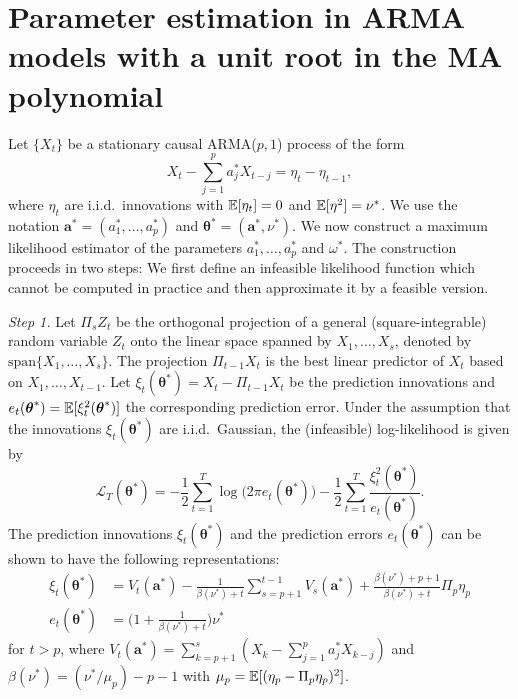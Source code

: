 \documentclass[a4paper,12pt]{article}
\begin{document}
\renewcommand{\baselinestretch}{1.2}\normalsize



\section{Parameter estimation in ARMA models with a unit root in the MA polynomial}


Let $\{X_t\}$ be a stationary causal ARMA($p,1$) process of the form 
\begin{equation}
X_t - \sum\limits_{j=1}^p a_j^* X_{t-j} = \eta_t - \eta_{t-1},
\end{equation}
where $\eta_t$ are i.i.d.\ innovations with $\mathbb{E}[\eta_t] = 0$ and $\mathbb{E}[\eta^2] = \nu^*$. We use the notation $\boldsymbol{a}^* = (a_1^*,\ldots,a_p^*)$ and $\boldsymbol{\theta}^* = (\boldsymbol{a}^*,\nu^*)$. We now construct a maximum likelihood estimator of the parameters $a_1^*,\ldots,a_p^*$ and $\omega^*$. The construction proceeds in two steps: We first define an infeasible likelihood function which cannot be computed in practice and then approximate it by a feasible version. 
\vspace{10pt}


\textit{Step 1.} Let $\Pi_s Z_t$ be the orthogonal projection of a general (square-integrable) random variable $Z_t$ onto the linear space spanned by $X_1,\ldots,X_s$, denoted by $\text{span}\{X_1,\ldots,X_s\}$. The projection $\Pi_{t-1} X_t$ is the best linear predictor of $X_t$ based on $X_1,\ldots,X_{t-1}$. Let $\xi_t(\boldsymbol{\theta}^*) = X_t - \Pi_{t-1} X_t$ be the prediction innovations and $e_t(\boldsymbol{\theta}^*) = \mathbb{E}[ \xi_t^2(\boldsymbol{\theta}^*)]$ the corresponding prediction error. Under the assumption that the innovations $\xi_t(\boldsymbol{\theta}^*)$ are i.i.d.\ Gaussian, the (infeasible) log-likelihood is given by  
\[ \mathcal{L}_T(\boldsymbol{\theta}^*) = -\frac{1}{2} \sum\limits_{t=1}^T \log \big(2 \pi e_t(\boldsymbol{\theta}^*)\big) - \frac{1}{2} \sum\limits_{t=1}^T \frac{\xi_t^2(\boldsymbol{\theta}^*)}{e_t(\boldsymbol{\theta}^*)}. \]
The prediction innovations $\xi_t(\boldsymbol{\theta}^*)$ and the prediction errors $e_t(\boldsymbol{\theta}^*)$ can be shown to have the following representations:  
\begin{align}
\xi_t(\boldsymbol{\theta}^*) & = V_t(\boldsymbol{a}^*) - \frac{1}{\beta(\nu^*) + t} \sum\limits_{s=p+1}^{t-1} V_s(\boldsymbol{a}^*) + \frac{\beta(\nu^*)+p+1}{\beta(\nu^*) + t} \Pi_p \eta_p \label{eq-pred-innovation} \\
e_t(\boldsymbol{\theta}^*)   & = \Big( 1 + \frac{1}{\beta(\nu^*)+t} \Big) \nu^* \label{eq-pred-error} 
\end{align}
for $t > p$, where $V_t(\boldsymbol{a}^*) = \sum_{k=p+1}^s (X_k - \sum_{j=1}^p a_j^* X_{k-j})$ and $\beta(\nu^*) = (\nu^*/\mu_p) - p - 1$ with $\mu_p = \mathbb{E}[(\eta_p - \Pi_p \eta_p)^2]$.
\vspace{10pt}
\end{document}
